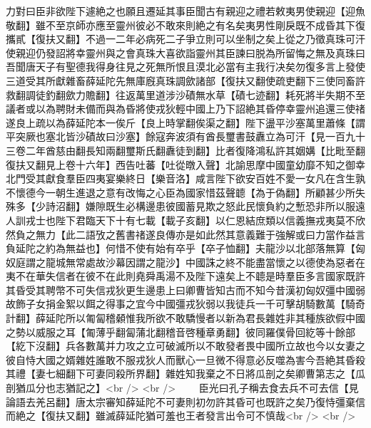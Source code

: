 力對曰臣非欲陛下遽絶之也願且遷延其事臣聞古有親迎之禮若敕夷男使親迎【迎魚敬翻】雖不至京師亦應至靈州彼必不敢來則絶之有名矣夷男性剛戾既不成昏其下復攜貳【復扶又翻】不過一二年必病死二子爭立則可以坐制之矣上從之乃徵真珠可汗使親迎仍發詔將幸靈州與之會真珠大喜欲詣靈州其臣諫曰脱為所留悔之無及真珠曰吾聞唐天子有聖德我得身往見之死無所恨且漠北必當有主我行决矣勿復多言上發使三道受其所獻雜畜薛延陀先無庫廐真珠調歛諸部【復扶又翻使疏吏翻下三使同畜許救翻調徒釣翻歛力贍翻】往返萬里道涉沙磧無水草【磧七迹翻】耗死將半失期不至議者或以為聘財未備而與為昏將使戎狄輕中國上乃下詔絶其昏停幸靈州追還三使禇遂良上疏以為薛延陀本一俟斤【良上時掌翻俟渠之翻】陛下盪平沙塞萬里蕭條【謂平突厥也塞北皆沙磧故曰沙塞】餘寇奔波須有酋長璽書鼓纛立為可汗【見一百九十三卷二年酋慈由翻長知兩翻璽斯氏翻纛徒到翻】比者復降鴻私許其姻媾【比毗至翻復扶又翻見上卷十六年】西告吐蕃【吐從暾入聲】北諭思摩中國童幼靡不知之御幸北門受其獻食羣臣四夷宴樂終日【樂音洛】咸言陛下欲安百姓不愛一女凡在含生孰不懷德今一朝生進退之意有改悔之心臣為國家惜茲聲聼【為于偽翻】所顧甚少所失殊多【少詩沼翻】嫌隙既生必構邊患彼國蓄見欺之怒此民懷負約之慙恐非所以服遠人訓戎士也陛下君臨天下十有七載【載子亥翻】以仁恩結庶類以信義撫戎夷莫不欣然負之無力【此二語攷之舊書禇遂良傳亦是如此然其意義難于強解或曰力當作益言負延陀之約為無益也】何惜不使有始有卒乎【卒子恤翻】夫龍沙以北部落無算【匈奴庭謂之龍城無常處故沙幕因謂之龍沙】中國誅之終不能盡當懷之以德使為惡者在夷不在華失信者在彼不在此則堯舜禹湯不及陛下遠矣上不聼是時羣臣多言國家既許其昏受其聘幣不可失信戎狄更生邊患上曰卿曹皆知古而不知今昔漢初匈奴彊中國弱故飾子女捐金絮以餌之得事之宜今中國彊戎狄弱以我徒兵一千可擊胡騎數萬【騎奇計翻】薛延陀所以匍匐稽顙惟我所欲不敢驕慢者以新為君長雜姓非其種族欲假中國之勢以威服之耳【匍薄乎翻匐蒲北翻稽音啓種章勇翻】彼同羅僕骨回紇等十餘部【紇下沒翻】兵各數萬并力攻之立可破滅所以不敢發者畏中國所立故也今以女妻之彼自恃大國之婿雜姓誰敢不服戎狄人而獸心一旦微不得意必反噬為害今吾絶其昏殺其禮【妻七細翻下可妻同殺所界翻】雜姓知我棄之不日將瓜剖之矣卿曹第志之【瓜剖猶瓜分也志猶記之】<br />
<br />
　　臣光曰孔子稱去食去兵不可去信【見論語去羌呂翻】唐太宗審知薛延陀不可妻則初勿許其昏可也既許之矣乃復恃彊棄信而絶之【復扶又翻】雖滅薛延陀猶可羞也王者發言出令可不慎哉<br />
<br />
